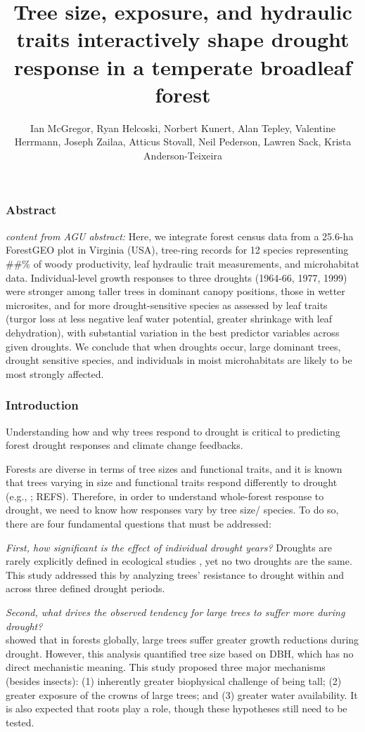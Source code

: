\documentclass[]{article}
\title{Tree size, exposure, and hydraulic traits interactively shape drought
response in a temperate broadleaf forest}
\author{Ian McGregor, Ryan Helcoski, Norbert Kunert, Alan Tepley, Valentine
Herrmann, Joseph Zailaa, Atticus Stovall, Neil Pederson, Lawren Sack,
Krista Anderson-Teixeira}
\date{}
\begin{document}
\maketitle

\hypertarget{abstract}{%
\subsubsection{Abstract}\label{abstract}}

\emph{content from AGU abstract:} Here, we integrate forest census data
from a 25.6-ha ForestGEO plot in Virginia (USA), tree-ring records for
12 species representing \#\#\% of woody productivity, leaf hydraulic
trait measurements, and microhabitat data. Individual-level growth
responses to three droughts (1964-66, 1977, 1999) were stronger among
taller trees in dominant canopy positions, those in wetter microsites,
and for more drought-sensitive species as assessed by leaf traits
(turgor loss at less negative leaf water potential, greater shrinkage
with leaf dehydration), with substantial variation in the best predictor
variables across given droughts. We conclude that when droughts occur,
large dominant trees, drought sensitive species, and individuals in
moist microhabitats are likely to be most strongly affected.

\hypertarget{introduction}{%
\subsubsection{Introduction}\label{introduction}}

Understanding how and why trees respond to drought is critical to
predicting forest drought responses and climate change feedbacks.

Forests are diverse in terms of tree sizes and functional traits, and it
is known that trees varying in size and functional traits respond
differently to drought (e.g., \citep{bennett_larger_2015}; REFS).
Therefore, in order to understand whole-forest response to drought, we
need to know how responses vary by tree size/ species. To do so, there
are four fundamental questions that must be addressed:

\emph{First, how significant is the effect of individual drought years?}
Droughts are rarely explicitly defined in ecological studies
\citep{slette_how_2019}, yet no two droughts are the same. This study
addressed this by analyzing trees' resistance to drought within and
across three defined drought periods.

\emph{Second, what drives the observed tendency for large trees to
suffer more during drought?}\\
\citep{bennett_larger_2015} showed that in forests globally, large trees
suffer greater growth reductions during drought. However, this analysis
quantified tree size based on DBH, which has no direct mechanistic
meaning. This study proposed three major mechanisms (besides insects):
(1) inherently greater biophysical challenge of being tall; (2) greater
exposure of the crowns of large trees; and (3) greater water
availability. It is also expected that roots play a role, though these
hypotheses still need to be tested.
\end{document}
